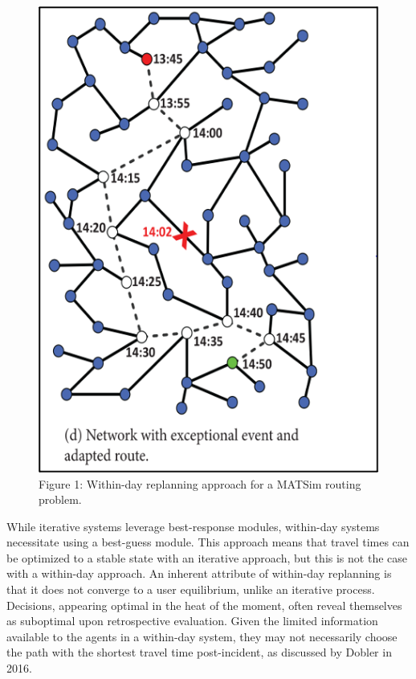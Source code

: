 \documentclass[
  letterpaper,
  authoryear]{elsarticle}
\begin{document}
\begin{figure}

{\centering \includegraphics{figures/fig1.png}

}

\caption{Figure 1: Within-day replanning approach for a MATSim routing
problem.}

\end{figure}

While iterative systems leverage best-response modules, within-day
systems necessitate using a best-guess module. This approach means that
travel times can be optimized to a stable state with an iterative
approach, but this is not the case with a within-day approach. An
inherent attribute of within-day replanning is that it does not converge
to a user equilibrium, unlike an iterative process. Decisions, appearing
optimal in the heat of the moment, often reveal themselves as suboptimal
upon retrospective evaluation. Given the limited information available
to the agents in a within-day system, they may not necessarily choose
the path with the shortest travel time post-incident, as discussed by
Dobler in 2016.
\end{document}
